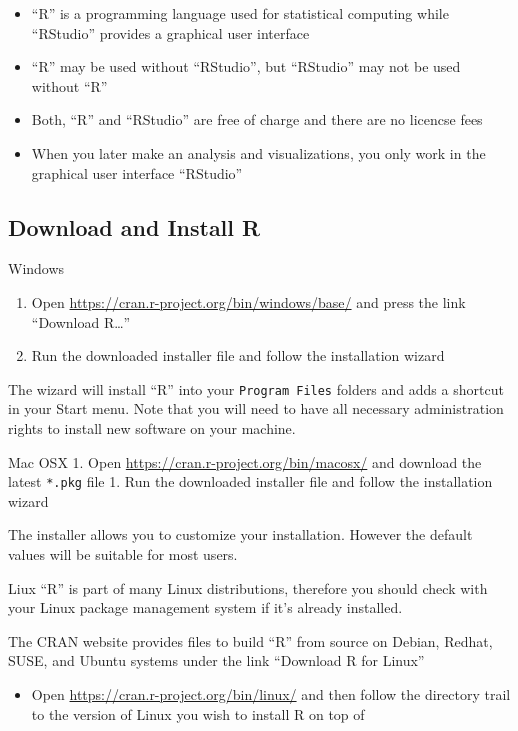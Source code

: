 \documentclass[
]{book}
\providecommand{\tightlist}{%
  \setlength{\itemsep}{0pt}\setlength{\parskip}{0pt}}
\begin{document}
\begin{itemize}
\tightlist
\item
  ``R'' is a programming language used for statistical computing while ``RStudio'' provides a graphical user interface
\item
  ``R'' may be used without ``RStudio'', but ``RStudio'' may not be used without ``R''
\item
  Both, ``R'' and ``RStudio'' are free of charge and there are no licencse fees
\item
  When you later make an analysis and visualizations, you only work in the graphical user interface ``RStudio''
\end{itemize}

\hypertarget{download-and-install-r}{%
\subsection{Download and Install R}\label{download-and-install-r}}

Windows

\begin{enumerate}
\def\labelenumi{\arabic{enumi}.}
\tightlist
\item
  Open \url{https://cran.r-project.org/bin/windows/base/} and press the link ``Download R\ldots{}''
\item
  Run the downloaded installer file and follow the installation wizard
\end{enumerate}

The wizard will install ``R'' into your \texttt{Program\ Files} folders and adds a shortcut in your Start menu. Note that you will need to have all necessary administration rights to install new software on your machine.

Mac OSX
1. Open \url{https://cran.r-project.org/bin/macosx/} and download the latest \texttt{*.pkg} file
1. Run the downloaded installer file and follow the installation wizard

The installer allows you to customize your installation. However the default values will be suitable for most users.

Liux
``R'' is part of many Linux distributions, therefore you should check with your Linux package management system if it's already installed.

The CRAN website provides files to build ``R'' from source on Debian, Redhat, SUSE, and Ubuntu systems under the link ``Download R for Linux''

\begin{itemize}
\tightlist
\item
  Open \url{https://cran.r-project.org/bin/linux/} and then follow the directory trail to the version of Linux you wish to install R on top of
\end{itemize}
\end{document}
